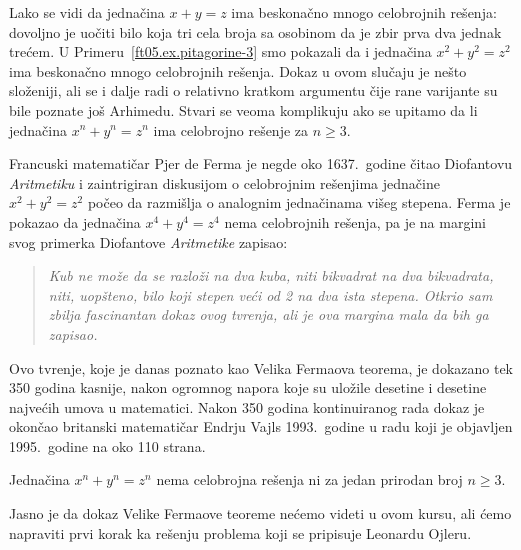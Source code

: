 Lako se vidi da jedna\v cina $x + y = z$ ima beskona\v cno mnogo celobrojnih re\v senja: dovoljno je
uo\v citi bilo koja tri cela broja sa osobinom da je zbir prva dva jednak tre\'cem.
U Primeru~\ref{ft05.ex.pitagorine-3} smo pokazali da i jedna\v cina $x^2 + y^2 = z^2$ ima beskona\v cno
mnogo celobrojnih re\v senja. Dokaz u ovom slu\v caju je ne\v sto slo\v zeniji, ali se i dalje radi o relativno kratkom
argumentu \v cije rane varijante su bile poznate jo\v s Arhimedu. Stvari se veoma komplikuju ako se upitamo
da li jedna\v cina $x^n + y^n = z^n$ ima celobrojno re\v senje za $n \ge 3$.

Francuski matemati\v car Pjer de Ferma je negde oko 1637.\ godine \v citao Diofantovu \emph{Aritmetiku}
i zaintrigiran diskusijom o celobrojnim re\v senjima jedna\v cine $x^2 + y^2 = z^2$ 
po\v ceo da razmi\v slja o analognim jedna\v cinama vi\v seg stepena. Ferma je pokazao
da jedna\v cina $x^4 + y^4 = z^4$ nema celobrojnih re\v senja, pa je na margini svog primerka
Diofantove \emph{Aritmetike} zapisao:
\begin{quote}
  \textit{Kub ne mo\v ze da se razlo\v zi na dva kuba, niti bikvadrat na dva bikvadrata, niti, uop\v steno, bilo koji stepen ve\'ci od 2 na
  dva ista stepena. Otkrio sam zbilja fascinantan dokaz ovog tvr\dj enja, ali je ova margina mala da bih ga zapisao.}
\end{quote}
Ovo tvr\dj enje, koje je danas poznato kao Velika Fermaova teorema,
je dokazano tek 350 godina kasnije, nakon ogromnog napora koje su ulo\v zile
desetine i desetine najve\'cih umova u matematici. Nakon 350 godina kontinuiranog rada dokaz je okon\v cao
britanski matemati\v car Endrju Vajls 1993.\ godine u radu koji je objavljen 1995.\ godine na oko 110 strana.

\begin{THM}
  Jedna\v cina $x^n + y^n = z^n$ nema celobrojna re\v senja ni za jedan prirodan broj $n \ge 3$.
\end{THM}

Jasno je da dokaz Velike Fermaove teoreme ne\'cemo videti u ovom kursu, ali \'cemo napraviti prvi korak
ka re\v senju problema koji se pripisuje Leonardu Ojleru.

